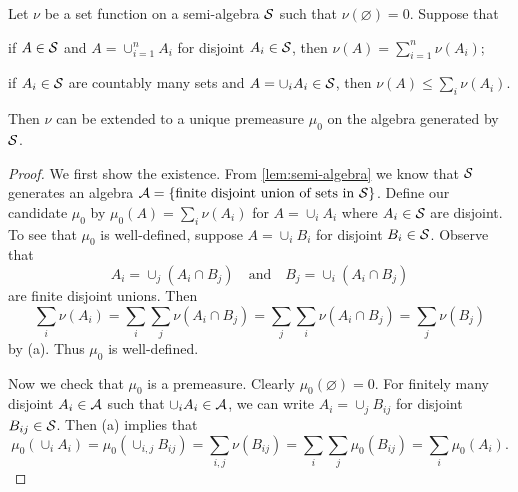 \begin{theorem}\label{thm:premeasure}
    Let $\nu$ be a set function on a semi-algebra $\S$ such that 
    $\nu(\varnothing) = 0$. Suppose that 
    \begin{thmenum}
        \item if $A\in\S$ and $A = \cup_{i=1}^n A_i$ for disjoint $A_i\in\S$, 
        then $\nu(A) = \sum_{i=1}^n \nu(A_i)$;
        \item if $A_i\in\S$ are countably many sets and $A = \cup_i A_i\in\S$, 
        then $\nu(A) \leq \sum_i \nu(A_i)$.
    \end{thmenum}
    Then $\nu$ can be extended to a unique premeasure $\mu_0$ on the 
    algebra generated by $\S$.
\end{theorem}
\begin{proof}
    We first show the existence. From \cref{lem:semi-algebra} we 
    know that $\S$ generates an algebra $\A = 
    \set{\text{finite disjoint union of sets in }\S}$. Define 
    our candidate $\mu_0$ by $\mu_0(A) = \sum_i\nu(A_i)$ 
    for $A = \cup_i A_i$ where $A_i\in\S$ are disjoint. To see that 
    $\mu_0$ is well-defined, suppose $A = \cup_i B_i$ 
    for disjoint $B_i\in\S$. Observe that 
    \begin{equation*}
        A_i = \cup_j (A_i\cap B_j) \quad\text{and}\quad
        B_j = \cup_i (A_i\cap B_j)
    \end{equation*}
    are finite disjoint unions. Then 
    \begin{equation*}
        \sum_i \nu(A_i) = \sum_i\sum_j\nu(A_i\cap B_j) 
        = \sum_j\sum_i\nu(A_i\cap B_j) = \sum_j \nu(B_j) 
    \end{equation*}
    by (a). Thus $\mu_0$ is well-defined. 
    
    Now we check that $\mu_0$ is a premeasure. Clearly 
    $\mu_0(\varnothing) = 0$. For finitely many disjoint 
    $A_i\in\A$ such that $\cup_i A_i\in\A$, we can write 
    $A_i = \cup_j B_{ij}$ for disjoint $B_{ij}\in\S$. Then 
    (a) implies that 
    \begin{equation*}
        \mu_0(\cup_i A_i) = \mu_0(\cup_{i,j} B_{ij})
        = \sum_{i,j} \nu(B_{ij}) = \sum_i\sum_j \mu_0(B_{ij})
        = \sum_i \mu_0(A_i).
    \end{equation*}


\end{proof}

